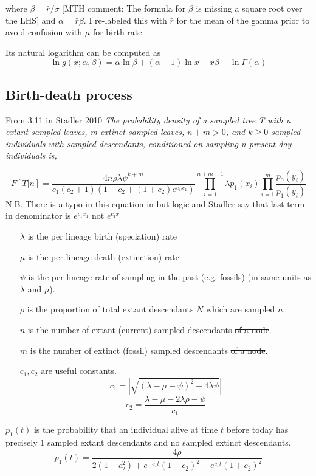 \documentclass{llncs}
\newcommand{\ejmcomment}[1]{{\color{green} #1}}
\newcommand{\mthcomment}[1]{{[\color{red}MTH comment: #1]}}
\newcommand{\mthstrike}[1]{{\color{red}\sout{#1}}}
\begin{document}
where $\beta = \bar{r} / \sigma$ \mthcomment{The formula for $\beta$ is missing a square root over the LHS} and $\alpha = \bar{r} \beta$.
\ejmcomment{I re-labeled this with $\bar{r}$ for the mean of the gamma prior to avoid confusion with $\mu$ for birth rate.}

Its natural logarithm can be computed as
$$ \ln g(x;\alpha,\beta) = \alpha\ln\beta + (\alpha-1)\ln x -x\beta - \ln\Gamma(\alpha) $$

\subsection{Birth-death process}
From 3.11 in Stadler 2010 \textit{The probability density of a sampled tree T with n
extant sampled leaves, m extinct sampled leaves, $n+m > 0$, and $k \geq 0$
sampled individuals with sampled descendants, conditioned on
sampling n present day individuals is,}

$$F[T|n] = \frac{4n\rho\lambda\psi^{k+m}}{c_1(c_2+1)(1-c_2+(1+c_2)e^{c_1x_1})}\prod_{i=1}^{n+m-1}\lambda p_1(x_i)\prod_{i=1}^{m}\frac{p_0(y_i)}{p_1(y_i)}$$
N.B. There is a typo in this equation in \cite{Stadler2010} but logic and Stadler say that last term in denominator is $e^{c_1x_1}$ not  $e^{c_1x}$ \\

\begin{enumerate}
\item[$\lambda$]  is the per lineage birth (speciation) rate
\item[$\mu$]  is the per lineage death (extinction) rate
\item[$\psi$]  is the per lineage rate of sampling in the past (e.g. fossils) (in same units as $\lambda$ and $\mu$).
\item[$\rho$ ] is the proportion of total extant descendants $N$ which are sampled $n$.
\item[$n$] is the number of extant (current) sampled descendants \mthstrike{of a node}.
\item[$m$] is the number of extinct (fossil) sampled descendants \mthstrike{of a node}.
\item[$c_1,c_2$]  are useful constants.
$$c_1 = |\sqrt{(\lambda-\mu-\psi)^2 + 4\lambda\psi}|$$
$$c_2 = \frac{\lambda-\mu-2\lambda\rho-\psi}{c_1}$$
\end{enumerate}

$p_1(t)$ is the probability that an individual alive at time $t$ before today has precisely 1 sampled extant descendants and no sampled extinct descendants.
$${p_1}(t) = \frac{4\rho}{2(1-c_2^2)+e^{-c_1t}(1-c_2)^2+e^{c_1t}(1+c_2)^2}$$
\end{document}
